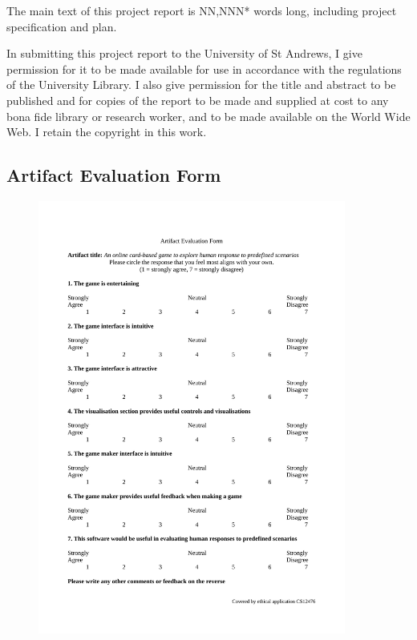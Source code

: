 \documentclass[]{report}
\begin{document}
The main text of this project report is  NN,NNN* words long, including project specification and plan.

In submitting this project report to the University of
St Andrews, I give permission for it to be made
available for use in accordance with the regulations of
the University Library. I also give permission for
the title and abstract to be published and for copies of
the report to be made and supplied at cost to any bona
fide library or research worker, and to be made
available on the World Wide Web. I retain the
copyright in this work.

\listoftodos











\nocite{*}
\printbibliography

\begin{appendices}
  \section{Artifact Evaluation Form}
  \begin{figure}[!h]
    \centering
    \includegraphics[width=0.9\textwidth]{./appendices/feedback.pdf}
    \label{appendix:artifact_eval}
  \end{figure}
\end{appendices}
\end{document}
